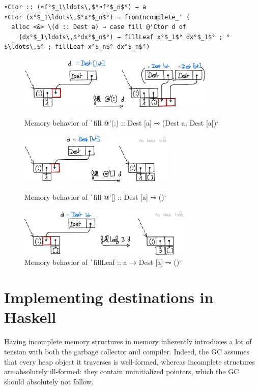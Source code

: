 \documentclass[english]{jflart}
\newlength{\currentparskip}
\newenvironment{unbreakable}
{%
  \setlength{\currentparskip}{\parskip}%
  \setlength{\parskip}{\currentparskip}%
  \par\vspace{0.5\baselineskip}%
  \noindent\begin{minipage}{\textwidth}%
    \setlength{\parskip}{\currentparskip}%
}
{%
  \end{minipage}%
  \par\vspace{0.5\baselineskip}%
}
\begin{document}
\begin{unbreakable}
{\small
\begin{verbatim}
¤Ctor :: (¤f°$_1\ldots\,$°¤f°$_n$°) → a
¤Ctor (x°$_1\ldots\,$°x°$_n$°) = fromIncomplete_' (
  alloc <&> \(d :: Dest a) → case fill @'Ctor d of
    (dx°$_1\ldots\,$°dx°$_n$°) → fillLeaf x°$_1$° dx°$_1$° ; °$\ldots\,$° ; fillLeaf x°$_n$° dx°$_n$°)
\end{verbatim}
}
\end{unbreakable}

\begin{figure}[t]\centering
  \includegraphics[width=9.5cm]{fillCons.png}
  \caption{Memory behavior of \texttt`fill @'(:) :: Dest [a] ⊸ (Dest a, Dest [a])`}
  \label{fig:schema-fillCons}

  \includegraphics[width=7.5cm]{fillNil.png}
  \caption{Memory behavior of \texttt`fill @'[] :: Dest [a] ⊸ ()`}
  \label{fig:schema-fillNil}

  \includegraphics[width=8.3cm]{fillLeaf.png}
  \caption{Memory behavior of \texttt`fillLeaf :: a → Dest [a] ⊸ ()`}
  \label{fig:schema-fillLeaf}
\end{figure}

\section{Implementing destinations in Haskell}\label{sec:implementation}

Having incomplete memory structures in memory inherently introduces a lot of tension with both the garbage collector and compiler. Indeed, the GC assumes that every heap object it traverses is well-formed, whereas incomplete structures are absolutely ill-formed: they contain uninitialized pointers, which the GC should absolutely not follow.
\end{document}
